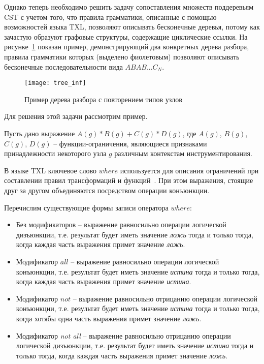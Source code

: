 Однако теперь необходимо решить задачу сопоставления множеств поддеревьям CST с учетом того, что правила грамматики, описанные с помощью возможностей языка TXL, позволяют описывать бесконечные деревья, потому как зачастую образуют графовые структуры, содержащие циклические ссылки.
На рисунке~\ref{fig:tree-inf} показан пример, демонстрирующий два конкретных дерева разбора, правила грамматики которых (выделено фиолетовым) позволяют описывать бесконечные последовательности вида $ABAB ... {C_N}$.

\begin{figure}[!h]
	\centering
	\texttt{[image: tree\_inf]}
	\caption{Пример дерева разбора с повторением типов узлов}
	\label{fig:tree-inf}
\end{figure}

Для решения этой задачи рассмотрим пример.

Пусть дано выражение $A(g) * B(g) + C(g) * D(g)$, где $A(g)$, $B(g)$, $C(g)$, $D(g)$ -- функции-ограничения, являющиеся признаками принадлежности некоторого узла $g$ различным контекстам инструментирования.

В языке TXL ключевое слово $where$ используется для описания ограничений при составлении правил трансформаций и функций~\cite{txl-book}.
При этом выражения, стоящие друг за другом объединяются посредством операции конъюнкции.

Перечислим существующие формы записи оператора $where$:
\begin{itemize}[noitemsep]
  \item Без модификаторов -- выражение равносильно операции логической дизъюнкции, т.е. результат будет иметь значение \textit{ложь} тогда и только тогда, когда каждая часть выражения примет значение \textit{ложь}.
  \item Модификатор $all$ -- выражение равносильно операции логической конъюнкции, т.е. результат будет иметь значение \textit{истина} тогда и только тогда, когда каждая часть выражения примет значение \textit{истина}.
  \item Модификатор $not$ -- выражение равносильно отрицанию операции логической конъюнкции, т.е. результат будет иметь значение \textit{истина} тогда и только тогда, когда хотябы одна часть выражения примет значение \textit{ложь}.
  \item Модификатор \textit{not all} -- выражение равносильно отрицанию операции логической дизъюнкции, т.е. результат будет иметь значение \textit{истина} тогда и только тогда, когда каждая часть выражения примет значение \textit{ложь}.
\end{itemize}

